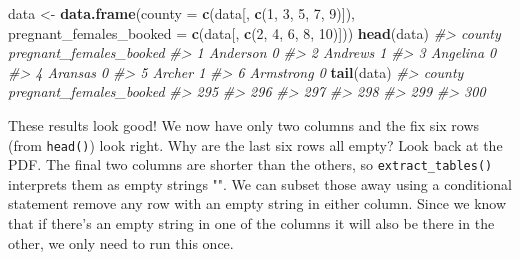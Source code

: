 \documentclass[
  12pt,
]{book}
\newenvironment{Shaded}{\begin{snugshade}}{\end{snugshade}}
\newcommand{\CommentTok}[1]{\textcolor[rgb]{0.37,0.37,0.37}{\textit{#1}}}
\newcommand{\DataTypeTok}[1]{\textcolor[rgb]{0.27,0.27,0.27}{#1}}
\newcommand{\DecValTok}[1]{\textcolor[rgb]{0.06,0.06,0.06}{#1}}
\newcommand{\KeywordTok}[1]{\textcolor[rgb]{0.27,0.27,0.27}{\textbf{#1}}}
\newcommand{\NormalTok}[1]{#1}
\newcommand{\StringTok}[1]{\textcolor[rgb]{0.5,0.5,0.5}{#1}}
\begin{document}
\begin{Shaded}
\begin{Highlighting}[]
\NormalTok{data <{-}}\StringTok{ }\KeywordTok{data.frame}\NormalTok{(}\DataTypeTok{county =} \KeywordTok{c}\NormalTok{(data[, }\KeywordTok{c}\NormalTok{(}\DecValTok{1}\NormalTok{, }\DecValTok{3}\NormalTok{, }\DecValTok{5}\NormalTok{, }\DecValTok{7}\NormalTok{, }\DecValTok{9}\NormalTok{)]),}
              \DataTypeTok{pregnant\_females\_booked =} \KeywordTok{c}\NormalTok{(data[, }\KeywordTok{c}\NormalTok{(}\DecValTok{2}\NormalTok{, }\DecValTok{4}\NormalTok{, }\DecValTok{6}\NormalTok{, }\DecValTok{8}\NormalTok{, }\DecValTok{10}\NormalTok{)]))}
\KeywordTok{head}\NormalTok{(data)}
\CommentTok{\#>      county pregnant\_females\_booked}
\CommentTok{\#> 1  Anderson                       0}
\CommentTok{\#> 2   Andrews                       1}
\CommentTok{\#> 3  Angelina                       0}
\CommentTok{\#> 4   Aransas                       0}
\CommentTok{\#> 5    Archer                       1}
\CommentTok{\#> 6 Armstrong                       0}
\KeywordTok{tail}\NormalTok{(data)}
\CommentTok{\#>     county pregnant\_females\_booked}
\CommentTok{\#> 295                               }
\CommentTok{\#> 296                               }
\CommentTok{\#> 297                               }
\CommentTok{\#> 298                               }
\CommentTok{\#> 299                               }
\CommentTok{\#> 300}
\end{Highlighting}
\end{Shaded}

These results look good! We now have only two columns and the fix six rows (from \texttt{head()}) look right. Why are the last six rows all empty? Look back at the PDF. The final two columns are shorter than the others, so \texttt{extract\_tables()} interprets them as empty strings "". We can subset those away using a conditional statement remove any row with an empty string in either column. Since we know that if there's an empty string in one of the columns it will also be there in the other, we only need to run this once.
\end{document}
